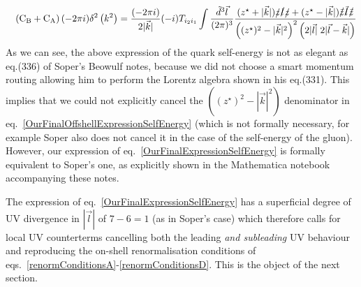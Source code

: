 \documentclass[11pt]{article}
\begin{document}
\begin{eqnarray}
\label{OurFinalExpressionSelfEnergy}
&& \left( \textrm{C}_\textrm{B}+ \textrm{C}_\textrm{A}\right) (-2\pi i)\delta^2\left(k^2\right) = \frac{(-2\pi i)}{2|\vec{k}|}(-i)T_{i_2 i_1}  \int \frac{\tilde{d}^3 \vec{l}}{(2\pi)^3}
\frac{
(z^\star+|\vec{k}|) \slashed{z}\slashed{l}\slashed{z} + (z^\star-|\vec{k}|)  \slashed{\bar{z}}\slashed{\bar{l}}\slashed{\bar{z}}
}{
\left( (z^\star)^2-|\vec{k}|^2\right)^2 \left( 2 |\vec{l}|\; 2 |\vec{l}-\vec{k}| \right) } \nonumber\\
\end{eqnarray}
As we can see, the above expression of the quark self-energy is not as elegant as eq.(336) of Soper's Beowulf notes, because we did not choose a smart momentum routing allowing him to perform the Lorentz algebra shown in his eq.(331).
This implies that we could not explicitly cancel the $\left( (z^\star)^2-|\vec{k}|^2\right)$ denominator in eq.~\ref{OurFinalOffshellExpressionSelfEnergy} (which is not formally necessary, for example Soper also does not cancel it in the case of the self-energy of the gluon). 
However, our expression of eq.~\ref{OurFinalExpressionSelfEnergy} is formally equivalent to Soper's one, as explicitly shown in the Mathematica notebook accompanying these notes.

The expression of eq.~\ref{OurFinalExpressionSelfEnergy} has a superficial degree of UV divergence in $|\vec{l}|$ of $7-6=1$ (as in Soper's case) which therefore calls for local UV counterterms cancelling both the leading \emph{and subleading} UV behaviour and reproducing the on-shell renormalisation conditions of eqs.~\ref{renormConditionsA}-\ref{renormConditionsD}.
This is the object of the next section. 
\end{document}
